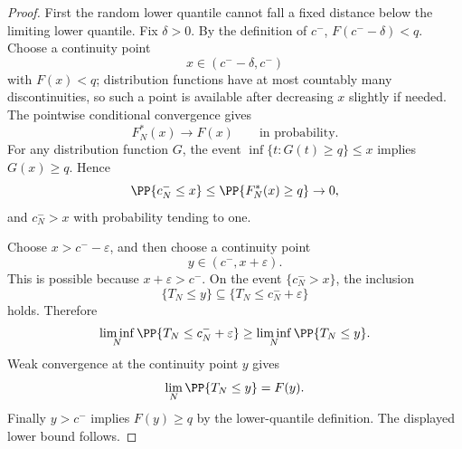 \begin{proof}
First the random lower quantile cannot fall a fixed distance below the
limiting lower quantile.  Fix \(\delta>0\).  By the definition of \(c^-\),
\(F(c^--\delta)<q\).  Choose a continuity point
\[
x\in(c^--\delta,c^-)
\]
with \(F(x)<q\); distribution functions have at most countably many
discontinuities, so such a point is available after decreasing \(x\) slightly
if needed.  The pointwise conditional convergence gives
\[
F_N^\ast(x)\to F(x)
\qquad\text{in probability}.
\]
For any distribution function \(G\), the event
\(\inf\{t:G(t)\ge q\}\le x\) implies \(G(x)\ge q\).  Hence
\[
\PP\{c_N^-\le x\}
\le
\PP\{F_N^\ast(x)\ge q\}\to0,
\]
and \(c_N^->x\) with probability tending to one.

Choose \(x>c^- -\varepsilon\), and then choose a continuity point
\[
y\in(c^-,x+\varepsilon).
\]
This is possible because \(x+\varepsilon>c^-\).  On the event
\(\{c_N^->x\}\), the inclusion
\[
\{T_N\le y\}\subseteq\{T_N\le c_N^-+\varepsilon\}
\]
holds.  Therefore
\[
\liminf_N\PP\{T_N\le c_N^-+\varepsilon\}
\ge
\liminf_N\PP\{T_N\le y\}.
\]
Weak convergence at the continuity point \(y\) gives
\[
\lim_N\PP\{T_N\le y\}=F(y).
\]
Finally \(y>c^-\) implies \(F(y)\ge q\) by the lower-quantile definition.
The displayed lower bound follows.
\end{proof}

